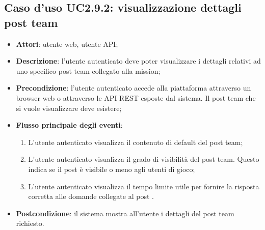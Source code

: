 \subsection{Caso d'uso UC2.9.2: visualizzazione dettagli post team}
\begin{itemize}
\item \textbf{Attori}: utente web, utente API;
\item \textbf{Descrizione}: l'utente autenticato deve poter visualizzare i dettagli relativi ad uno specifico post team collegato alla mission; 
      \item \textbf{Precondizione}: l'utente autenticato accede alla piattaforma attraverso un browser web o attraverso le API REST esposte dal sistema. Il post team che si vuole visualizzare deve esistere;

        \item \textbf{Flusso principale degli eventi}:
          \begin{enumerate}
          \item L'utente autenticato visualizza il contenuto di default del post team;
          \item L'utente autenticato visualizza il grado di visibilità del post team. Questo indica se il post è visibile o meno agli utenti di gioco;
          \item L'utente autenticato visualizza il tempo limite utile per fornire la risposta corretta alle domande collegate al post .

      \end{enumerate}
    \item \textbf{Postcondizione}: il sistema mostra all'utente i dettagli del post team richiesto.
  \end{itemize}
\hypertarget{UC2.9.3}{}
